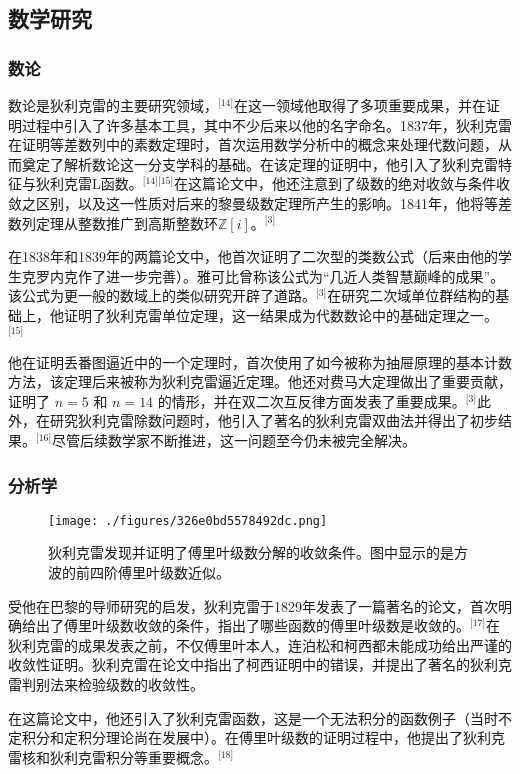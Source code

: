 \subsection{数学研究}
\subsubsection{数论}
数论是狄利克雷的主要研究领域，\(^\text{[14]}\)在这一领域他取得了多项重要成果，并在证明过程中引入了许多基本工具，其中不少后来以他的名字命名。1837年，狄利克雷在证明等差数列中的素数定理时，首次运用数学分析中的概念来处理代数问题，从而奠定了解析数论这一分支学科的基础。在该定理的证明中，他引入了狄利克雷特征与狄利克雷L函数。\(^\text{[14][15]}\)在这篇论文中，他还注意到了级数的绝对收敛与条件收敛之区别，以及这一性质对后来的黎曼级数定理所产生的影响。1841年，他将等差数列定理从整数推广到高斯整数环$\mathbb{Z}[i]$。\(^\text{[3]}\)

在1838年和1839年的两篇论文中，他首次证明了二次型的类数公式（后来由他的学生克罗内克作了进一步完善）。雅可比曾称该公式为“几近人类智慧巅峰的成果”。该公式为更一般的数域上的类似研究开辟了道路。\(^\text{[3]}\)在研究二次域单位群结构的基础上，他证明了狄利克雷单位定理，这一结果成为代数数论中的基础定理之一。\(^\text{[15]}\)

他在证明丢番图逼近中的一个定理时，首次使用了如今被称为抽屉原理的基本计数方法，该定理后来被称为狄利克雷逼近定理。他还对费马大定理做出了重要贡献，证明了 $n=5$ 和 $n=14$ 的情形，并在双二次互反律方面发表了重要成果。\(^\text{[3]}\)此外，在研究狄利克雷除数问题时，他引入了著名的狄利克雷双曲法并得出了初步结果。\(^\text{[16]}\)尽管后续数学家不断推进，这一问题至今仍未被完全解决。
\subsubsection{分析学}
\begin{figure}[ht]
\centering
\texttt{[image: ./figures/326e0bd5578492dc.png]}
\caption{狄利克雷发现并证明了傅里叶级数分解的收敛条件。图中显示的是方波的前四阶傅里叶级数近似。} \label{fig_YBGL_2}
\end{figure}
受他在巴黎的导师研究的启发，狄利克雷于1829年发表了一篇著名的论文，首次明确给出了傅里叶级数收敛的条件，指出了哪些函数的傅里叶级数是收敛的。\(^\text{[17]}\)在狄利克雷的成果发表之前，不仅傅里叶本人，连泊松和柯西都未能成功给出严谨的收敛性证明。狄利克雷在论文中指出了柯西证明中的错误，并提出了著名的狄利克雷判别法来检验级数的收敛性。

在这篇论文中，他还引入了狄利克雷函数，这是一个无法积分的函数例子（当时不定积分和定积分理论尚在发展中）。在傅里叶级数的证明过程中，他提出了狄利克雷核和狄利克雷积分等重要概念。\(^\text{[18]}\)

